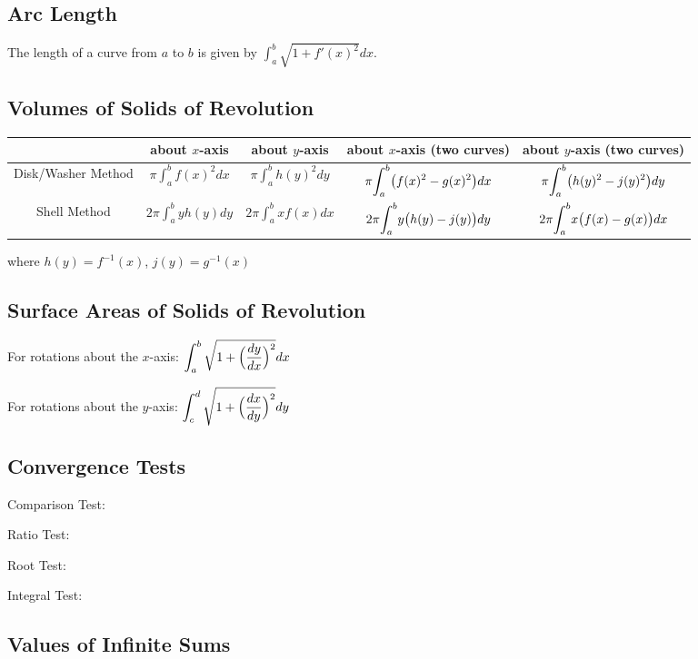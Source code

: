 \subsection{Arc Length}

The length of a curve from $a$ to $b$ is given by $\displaystyle{\int_{a}^{b}} \sqrt{1 + f'(x)^{2}}dx$.

\subsection{Volumes of Solids of Revolution}

\begin{tabular}{c|c|c|c|c}

& about $x$-axis & about $y$-axis & about $x$-axis (two curves) & about $y$-axis (two curves)\\ \hline
Disk/Washer Method & $\pi \displaystyle{\int_{a}^{b}} f(x)^{2} dx$ & $\pi \displaystyle{\int_{a}^{b}} h(y)^{2} dy$ & $\pi \displaystyle{\int_{a}^{b}} \big{(}f(x)^{2} - g(x)^{2}\big{)} dx$ & $\pi \displaystyle{\int_{a}^{b}} \big{(}h(y)^{2} - j(y)^{2}\big{)} dy$ \\ \hline
Shell Method & $2\pi \displaystyle{\int_{a}^{b}} yh(y) dy$ & $2\pi \displaystyle{\int_{a}^{b}} xf(x) dx$ & $2\pi \displaystyle{\int_{a}^{b}} y\big{(}h(y) - j(y)\big{)} dy$ & $2\pi \displaystyle{\int_{a}^{b}} x\big{(}f(x) - g(x)\big{)} dx$

\end{tabular} where $h(y) = f^{-1}(x)$, $j(y) = g^{-1}(x)$


\subsection{Surface Areas of Solids of Revolution}

For rotations about the $x$-axis: $\displaystyle\int_{a}^{b} \sqrt{1+ \Big{(}\dfrac{dy}{dx}\Big{)}^2} dx$

For rotations about the $y$-axis: $\displaystyle\int_{c}^{d} \sqrt{1+ \Big{(}\dfrac{dx}{dy}\Big{)}^2} dy$


\subsection{Convergence Tests}

Comparison Test:

Ratio Test:

Root Test:

Integral Test:

\subsection{Values of Infinite Sums}

